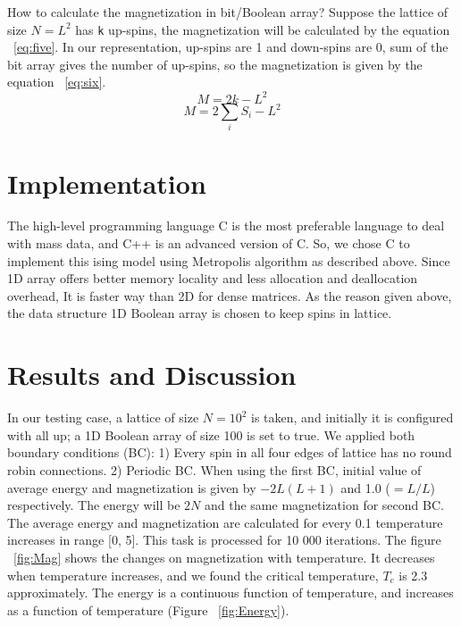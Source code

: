 \documentclass[]{article}
\begin{document}
How to calculate the magnetization in bit/Boolean array? Suppose the lattice of size $N = L^2$ has \texttt{k} up-spins, the magnetization will be calculated by the equation ~\ref{eq:five}. In our representation, up-spins are 1 and down-spins are 0, sum of the bit array gives the number of up-spins, so the magnetization is given by the equation ~\ref{eq:six}.
\begin{equation}
\label{eq:five}
M = 2k-L^2
\end{equation}
\begin{equation}
\label{eq:six}
M = 2\sum_{i}S_i -L^2
\end{equation}

\section{Implementation}
The high-level programming language C is the most preferable language to deal with mass data, and C++ is an advanced version of C. So, we chose C to implement this ising model using Metropolis algorithm as described above. Since 1D array offers better memory locality and less allocation and deallocation overhead, It is faster way than 2D for dense matrices. As the reason given above, the data structure 1D Boolean array is chosen to keep spins in lattice.  

\section{Results and Discussion}
In our testing case, a lattice of size $N = 10^2$ is taken, and initially it is configured with all up; a 1D Boolean array of size 100 is set to true. We applied both boundary conditions (BC): 1) Every spin in all four edges of lattice has no round robin connections. 2) Periodic BC. When using the first BC, initial value of average energy and magnetization is given by $-2L(L+1)$ and 1.0 ($=L/L$) respectively. The energy will be $2N$ and the same magnetization for second BC. The average energy and magnetization are calculated for every 0.1 temperature increases in range [0, 5]. This task is processed for 10 000 iterations. The figure ~\ref{fig:Mag} shows the changes on magnetization with temperature. It decreases when temperature increases, and we found the critical temperature, $T_c$ is 2.3 approximately. The energy is a continuous function of temperature, and increases as a function of temperature (Figure ~\ref{fig:Energy}).    
\end{document}

